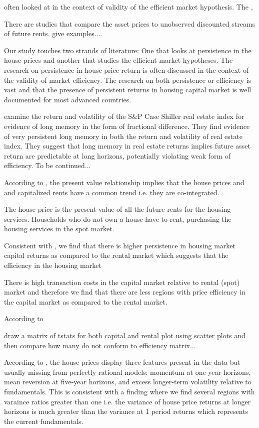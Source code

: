 \documentclass[AEJ,reqno, draftmode]{AEA}
\begin{document}
often looked at in the context of validity of the efficient market hypothesis. The 
,

There are studies that compare the asset prices to unobserved discounted streams of future rents. give examples....




Our study touches two strands of literature: One that looks at persistence in the house prices and another that studies the efficient market hypotheses. The research on persistence in house price return is often discussed in the context of the validity of market efficiency. The research on both persistence or efficiency is vast and that the presence of persistent returns in housing capital market is well documented for most advanced countries.


\citet{elder2012persistence} examine the return and volatility of the S\&P Case Shiller real estate index for evidence of long memory in the form of fractional difference. They find evidence of very persistent long memory in both the return and volatility of real estate index. They suggest that long memory in real estate returns implies future asset return are predictable at long horizons, potentially violating weak form of efficiency. To be continued...





According to \citet{meese1994testing}, the present value relationship implies that the house prices and and capitalized rents have a common trend i.e. they are co-integrated. 

The house price is the present value of all the future rents for the housing services. Households who do not own a house have to rent, purchasing the housing services in the spot market.

Consistent with \citet{meese1994testing}, we find that there is higher persistence in housing market capital returns as compared to the rental market which suggests that the efficiency in the housing market 

There is high transaction costs in the capital market relative to rental (spot) market and therefore we find that there are less regions with price efficiency in the capital market as compared to the rental market.

According to \citet{}

draw a matrix of tstats for both capital and rental plot using scatter plots and then compare how many do not conform to efficiency matrix...

According to \citet{glaeser2017extrapolative}, the house prices display three features present in the data but usually missing from perfectly rational models: momentum at one-year horizons, mean reversion at five-year horizons, and excess longer-term volatility relative to fundamentals. This is consistent with a finding where we find several regions with varaince ratios greater than one i.e. the variance of house price returns at longer horizons is much greater than the variance at 1 period returns which represents the current fundamentals.
\end{document}
